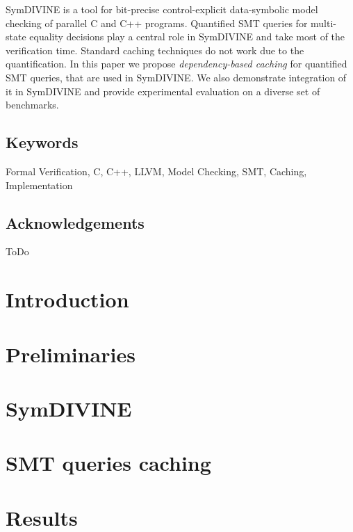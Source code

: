 \documentclass[11pt,twoside,a4paper]{book}
\newcommand{\symdivine}{\mbox{\textsf{SymDIVINE}}\xspace}
\newcommand{\smt}{\mbox{\textsf{SMT}}\xspace}
\newcommand{\llvm}{\textsf{LLVM}\xspace}
\begin{document}
\symdivine is a tool for bit-precise control-explicit data-symbolic model
checking of parallel C and C++ programs. Quantified \smt queries for multi-state
equality decisions play a central role in \symdivine and take most of the
verification time. Standard caching techniques do not work due to the
quantification. In this paper we propose \textit{dependency-based caching} for
quantified \smt queries, that are used in \symdivine. We also demonstrate
integration of it in \symdivine and provide experimental evaluation on a diverse
set of benchmarks.

\section*{Keywords}
Formal Verification, C, C++, \llvm, Model Checking, \smt, Caching, Implementation

\cleardoublepage

\section*{Acknowledgements}
ToDo

\cleardoublepage
\thispagestyle{empty}

\pagestyle{headings}
\tableofcontents %
\mainmatter

\chapter{Introduction}\label{chap:introduction}


\chapter{Preliminaries}\label{chap:preliminaries}


\chapter{\symdivine} \label{chap:symdivine}


\chapter{\smt queries caching} \label{chap:caching}


\chapter{Results} \label{chap:results}

\end{document}

